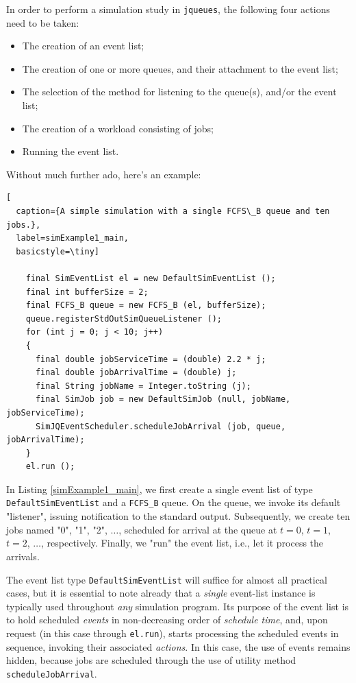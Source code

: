 \documentclass[12pt]{book}
\begin{document}
In order to perform a simulation study in \lstinline|jqueues|,
  the following four actions need to be taken:
\begin{itemize}
\item The creation of an event list;
\item The creation of one or more queues, and their attachment to the event list;
\item The selection of the method for listening to the queue(s), and/or the event list;
\item The creation of a workload consisting of jobs;
\item Running the event list.
\end{itemize}
Without much further ado, here's an example:

\begin{lstlisting}[
  caption={A simple simulation with a single FCFS\_B queue and ten jobs.},
  label=simExample1_main,
  basicstyle=\tiny]

    final SimEventList el = new DefaultSimEventList ();
    final int bufferSize = 2;
    final FCFS_B queue = new FCFS_B (el, bufferSize);
    queue.registerStdOutSimQueueListener ();
    for (int j = 0; j < 10; j++)
    {
      final double jobServiceTime = (double) 2.2 * j;
      final double jobArrivalTime = (double) j;
      final String jobName = Integer.toString (j);
      final SimJob job = new DefaultSimJob (null, jobName, jobServiceTime);
      SimJQEventScheduler.scheduleJobArrival (job, queue, jobArrivalTime);
    }
    el.run ();

\end{lstlisting}

In Listing \ref{simExample1_main},
  we first create a single event list of type \lstinline|DefaultSimEventList|
  and a \lstinline|FCFS_B| queue.
On the queue, we invoke its default "listener",
  issuing notification to the standard output.
Subsequently,
  we create ten jobs named "0", "1", "2", $\ldots$,
  scheduled for arrival at the queue
  at $t=0$, $t=1$, $t=2$, $\ldots$,
  respectively.
Finally, we "run" the event list, i.e.,
  let it process the arrivals.

The event list type
  \lstinline|DefaultSimEventList|
  will suffice for almost all practical cases,
  but it is essential to note already that
  a {\em single\/} event-list instance is typically used
  throughout {\em any\/} simulation program.
Its purpose of the event list is to hold scheduled {\em events\/}
  in non-decreasing order of {\em schedule time},
  and, upon request (in this case through \lstinline|el.run|),
  starts processing the scheduled events in sequence,
  invoking their associated {\em actions}.
In this case,
  the use of events remains hidden,
  because jobs are scheduled through the use of utility method
  \lstinline|scheduleJobArrival|.
\end{document}
